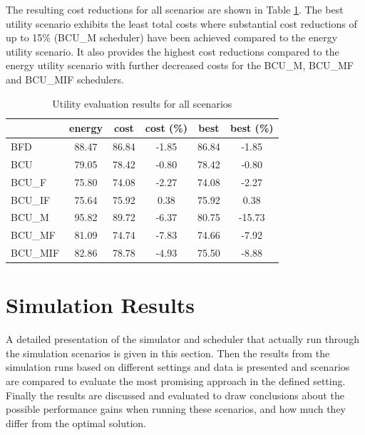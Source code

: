 The resulting cost reductions for all scenarios are shown in Table \ref{tab:utility_evaluation_results}. 
The best utility scenario exhibits the least total costs where substantial cost reductions of up to 15\% (BCU\_M scheduler) have been achieved compared to the energy utility scenario. It also provides the highest cost reductions compared to the energy utility scenario with further decreased costs for the BCU\_M, BCU\_MF and BCU\_MIF schedulers. 


\begin{table}[htbp]
\centering
\begin{tabular}{lccccc}
\toprule
{} &  energy &   cost &  cost (\%) &   best &  best (\%) \\
\midrule
BFD     &   88.47 &  86.84 &     -1.85 &  86.84 &     -1.85 \\
BCU     &   79.05 &  78.42 &     -0.80 &  78.42 &     -0.80 \\
BCU\_F   &   75.80 &  74.08 &     -2.27 &  74.08 &     -2.27 \\
BCU\_IF  &   75.64 &  75.92 &      0.38 &  75.92 &      0.38 \\
BCU\_M   &   95.82 &  89.72 &     -6.37 &  80.75 &    -15.73 \\
BCU\_MF  &   81.09 &  74.74 &     -7.83 &  74.66 &     -7.92 \\
BCU\_MIF &   82.86 &  78.78 &     -4.93 &  75.50 &     -8.88 \\
\bottomrule
\end{tabular}
\caption{Utility evaluation results for all scenarios}
\label{tab:utility_evaluation_results}
\end{table}







\section{Simulation Results} \label{sec:simulation_results}

A detailed presentation of the simulator and scheduler that actually run through the simulation scenarios is given in this section. Then the results from the simulation runs based on different settings and data is presented and scenarios are compared to evaluate the most promising approach in the defined setting. Finally the results are discussed and evaluated to draw conclusions about the possible performance gains when running these scenarios, and how much they differ from the optimal solution. 







